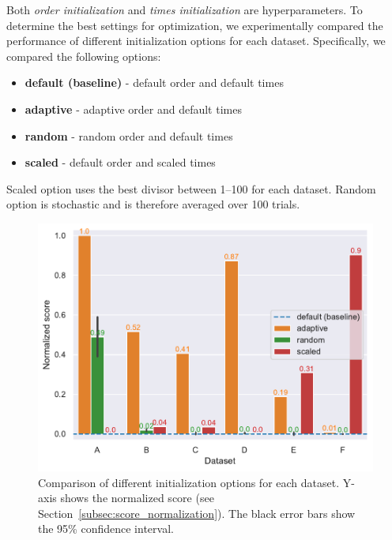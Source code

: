 \medskip

Both \textit{order initialization} and \textit{times initialization} are hyperparameters.
To determine the best settings for optimization, we experimentally compared the performance of different initialization options for each dataset.
Specifically, we compared the following options:
\begin{itemize}
    \item \textcolor{myblue}{\textbf{default (baseline)}} - default order and default times
    \item \textcolor{myorange}{\textbf{adaptive}} - adaptive order and default times
    \item \textcolor{mygreen}{\textbf{random}} - random order and default times
    \item \textcolor{myred}{\textbf{scaled}} - default order and scaled times
\end{itemize}
Scaled option uses the best divisor between 1--100 for each dataset.
Random option is stochastic and is therefore averaged over 100 trials.

\begin{figure}[h]
    \centering
    \includegraphics[width=\linewidth]{img/experiments/init_experiment.pdf}
    \caption[Comparison of initialization options]{
        Comparison of different initialization options for each dataset.
        Y-axis shows the normalized score (see Section~\ref{subsec:score_normalization}).
        The black error bars show the 95\% confidence interval.
    }
    \label{fig:init_comparison}
\end{figure}

